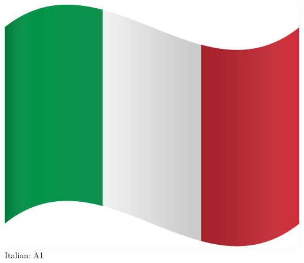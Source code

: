 \documentclass[]{deedy-resume-openfont}
\begin{document}
\begin{minipage}[t]{0.35\textwidth}
\includegraphics[scale=0.015]{images/italy.png}  Italian: A1




\end{minipage}
\end{document}
